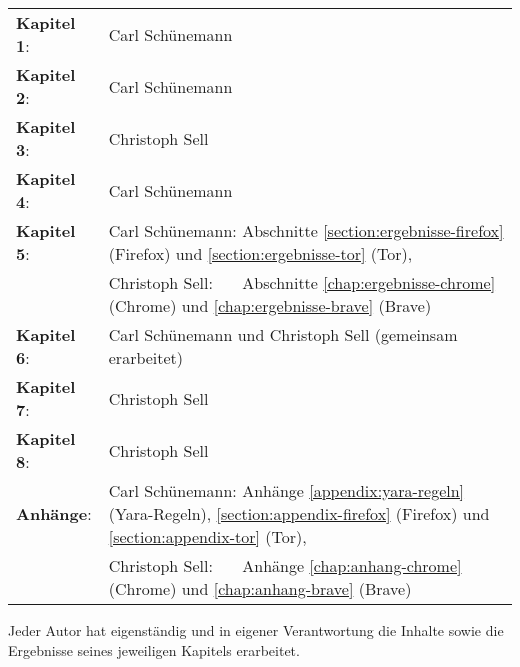 \begin{tabular}{ll}
	\textbf{Kapitel 1}:	& Carl Schünemann \tabularnewline
	\textbf{Kapitel 2}:	& Carl Schünemann \tabularnewline
	\textbf{Kapitel 3}:	& Christoph Sell \tabularnewline
	\textbf{Kapitel 4}:	& Carl Schünemann \tabularnewline
	\textbf{Kapitel 5}:	& Carl Schünemann: Abschnitte \ref{section:ergebnisse-firefox} (Firefox) und \ref{section:ergebnisse-tor} (Tor), \tabularnewline
				& Christoph Sell: $\,\,\,\,\,\,\,$ Abschnitte \ref{chap:ergebnisse-chrome} (Chrome) und \ref{chap:ergebnisse-brave} (Brave) \tabularnewline
	\textbf{Kapitel 6}:	& Carl Schünemann und Christoph Sell (gemeinsam erarbeitet)\tabularnewline
	\textbf{Kapitel 7}:	& Christoph Sell \tabularnewline
	\textbf{Kapitel 8}:	& Christoph Sell \tabularnewline
	\textbf{Anhänge}:	& Carl Schünemann: Anhänge \ref{appendix:yara-regeln} (Yara-Regeln), \ref{section:appendix-firefox} (Firefox) und \ref{section:appendix-tor} (Tor), \tabularnewline
				& Christoph Sell: $\,\,\,\,\,\,\,$ Anhänge \ref{chap:anhang-chrome} (Chrome) und \ref{chap:anhang-brave} (Brave) \tabularnewline
\end{tabular}

\vspace*{0.5cm}

Jeder Autor hat eigenständig und in eigener Verantwortung die Inhalte sowie die Ergebnisse seines jeweiligen Kapitels erarbeitet.

